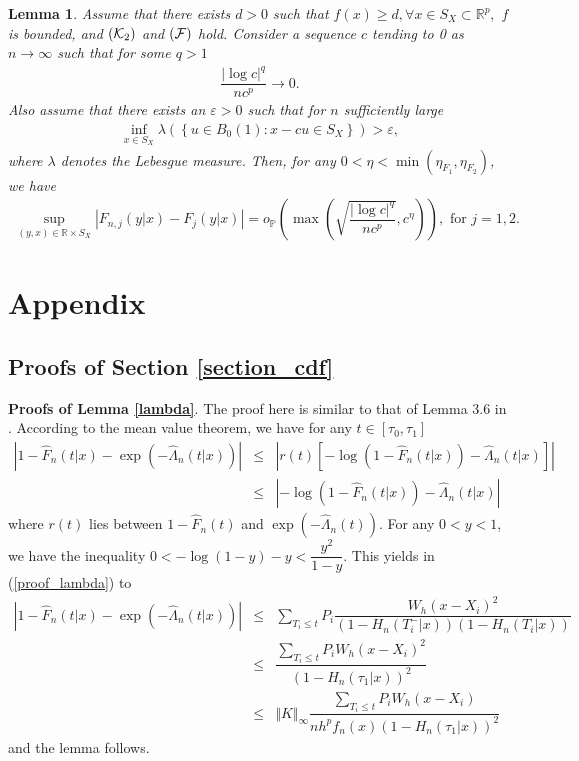 \documentclass[12pt]{article}
\newtheorem{lemma}{Lemma}[section]
\begin{document}
\begin{lemma}
\label{lem_margins}
Assume that there exists $d>0$ such that $f(x)\geq d, \forall x\in S_X \subset \mathbb R^p,$  $f$ is bounded, and $({\cal K}_2)$ and $({\cal F})$ hold. Consider a sequence $c$ tending to 0 as $n\to \infty$ such that for some $q>1$ 
\begin{eqnarray*}
\dfrac{\vert\log c\vert^q}{nc^p}\longrightarrow 0.
\end{eqnarray*}
Also assume that there exists an $\varepsilon>0$ such that for $n$ sufficiently large
\begin{eqnarray}
\inf_{x\in S_X} \lambda\left(\left\{u \in B_0(1): x-cu\in S_X\right\}\right)>\varepsilon,
\label{newcondition}
\end{eqnarray}
where $\lambda$ denotes the Lebesgue measure. Then, for any  $0<\eta<\min(\eta_{F_1}, \eta_{F_2})$, we have  
\begin{eqnarray*}
\sup_{(y,x)\in\mathbb{R}\times S_X}\left\vert F_{n,j}(y|x)-F_j(y|x)\right\vert =o_\mathbb{P}\left(\max\left(\sqrt{\dfrac{\vert\log c\vert^q}{nc^p}}, c^\eta\right)\right), \mbox{ for $j=1, 2$}.
\end{eqnarray*}
\end{lemma}

\section{Appendix}
\subsection{Proofs of Section \ref{section_cdf}}

\textbf{Proofs of Lemma \ref{lambda}}. The proof here is similar to that of Lemma 3.6 in \cite{Dikta1998}. 
According to the mean value theorem, we have for any $t\in[\tau_0,\tau_1]$
\begin{eqnarray}
\label{proof_lambda}
\nonumber\left|1-\widehat{F}_n(t|x)-\exp(-\widehat{\Lambda}_n(t|x))\right|&\leq& \left|r(t)\left[-\log(1-\widehat{F}_n(t|x))-\widehat{\Lambda}_n(t|x)\right]\right|\\
&\leq&\left|-\log(1-\widehat{F}_n(t|x))-\widehat{\Lambda}_n(t|x)\right|
\end{eqnarray}
where $r(t)$ lies between $1-\widehat{F}_n(t)$ and $\exp(-\widehat{\Lambda}_n(t))$. For any $0<y<1$, we have the inequality $0<-\log(1-y)-y<\dfrac{y^2}{1-y}$. This yields in (\ref{proof_lambda}) to
\begin{eqnarray*}
\left|1-\widehat{F}_n(t|x)-\exp(-\widehat{\Lambda}_n(t|x))\right|&\leq&\sum_{T_i\leq t}P_i\dfrac{W_h(x-X_i)^2}{(1-H_n(T_i^-|x))(1-H_n(T_i|x))}\\
&\leq&\dfrac{\sum_{T_i\leq t}P_iW_h(x-X_i)^2}{(1-H_n(\tau_1|x))^2}\\
&\leq&\Vert K\Vert_\infty\dfrac{\sum_{T_i\leq t}P_iW_h(x-X_i)}{nh^pf_n(x)(1-H_n(\tau_1|x))^2}
\end{eqnarray*}
and the lemma follows.\\
\end{document}
